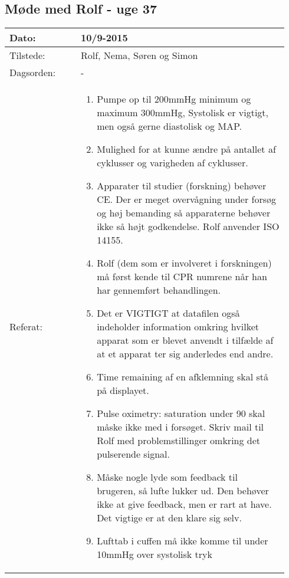 	\subsection{Møde med Rolf - uge 37} \label{app:rolfuge37}
	\begin{longtable}{|p{0.24\linewidth}|p{0.7\linewidth}|}
		\hline
		Dato: & 10/9-2015\\ \hline
		Tilstede: & Rolf, Nema, Søren og Simon\\ \hline
		Dagsorden: & -
		\\ \hline
		Referat: & 
		\begin{enumerate}
			\item Pumpe op til 200mmHg minimum og maximum 300mmHg, Systolisk er vigtigt, men også gerne diastolisk og MAP.
			\item Mulighed for at kunne ændre på antallet af cyklusser og varigheden af cyklusser.
			\item Apparater til studier (forskning) behøver CE. Der er meget overvågning under forsøg og høj bemanding så apparaterne behøver ikke så højt godkendelse. Rolf anvender ISO 14155.
			\item Rolf (dem som er involveret i forskningen) må først kende til CPR numrene når han har gennemført behandlingen.
			\item Det er VIGTIGT at datafilen også indeholder information omkring hvilket apparat som er blevet anvendt i tilfælde af at et apparat ter sig anderledes end andre.
			\item Time remaining af en afklemning skal stå på displayet.
			\item Pulse oximetry: saturation under 90 skal måske ikke med i forsøget. Skriv mail til Rolf med problemstillinger omkring det pulserende signal.
			\item Måske nogle lyde som feedback til brugeren, så lufte lukker ud. Den behøver ikke at give feedback, men er rart at have. Det vigtige er at den klare sig selv.
			\item Lufttab i cuffen må ikke komme til under 10mmHg over systolisk tryk
		\end{enumerate}
		\\ \hline
	\end{longtable}
	
